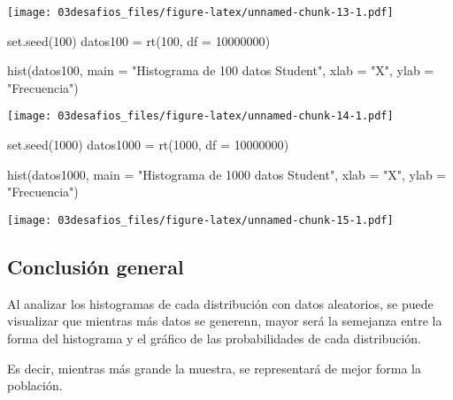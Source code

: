 \documentclass[
]{article}
\newenvironment{Shaded}{\begin{snugshade}}{\end{snugshade}}
\newcommand{\AttributeTok}[1]{\textcolor[rgb]{0.77,0.63,0.00}{#1}}
\newcommand{\DecValTok}[1]{\textcolor[rgb]{0.00,0.00,0.81}{#1}}
\newcommand{\FunctionTok}[1]{\textcolor[rgb]{0.00,0.00,0.00}{#1}}
\newcommand{\NormalTok}[1]{#1}
\newcommand{\OtherTok}[1]{\textcolor[rgb]{0.56,0.35,0.01}{#1}}
\newcommand{\StringTok}[1]{\textcolor[rgb]{0.31,0.60,0.02}{#1}}
\begin{document}
\texttt{[image: 03desafios\_files/figure-latex/unnamed-chunk-13-1.pdf]}

\begin{Shaded}
\begin{Highlighting}[]
\FunctionTok{set.seed}\NormalTok{(}\DecValTok{100}\NormalTok{)}
\NormalTok{datos100 }\OtherTok{=} \FunctionTok{rt}\NormalTok{(}\DecValTok{100}\NormalTok{, }\AttributeTok{df =} \DecValTok{10000000}\NormalTok{)}

\FunctionTok{hist}\NormalTok{(datos100, }\AttributeTok{main =} \StringTok{"Histograma de 100 datos Student"}\NormalTok{, }\AttributeTok{xlab =} \StringTok{"X"}\NormalTok{, }\AttributeTok{ylab =} \StringTok{"Frecuencia"}\NormalTok{)}
\end{Highlighting}
\end{Shaded}

\texttt{[image: 03desafios\_files/figure-latex/unnamed-chunk-14-1.pdf]}

\begin{Shaded}
\begin{Highlighting}[]
\FunctionTok{set.seed}\NormalTok{(}\DecValTok{1000}\NormalTok{)}
\NormalTok{datos1000 }\OtherTok{=} \FunctionTok{rt}\NormalTok{(}\DecValTok{1000}\NormalTok{, }\AttributeTok{df =} \DecValTok{10000000}\NormalTok{)}

\FunctionTok{hist}\NormalTok{(datos1000, }\AttributeTok{main =} \StringTok{"Histograma de 1000 datos Student"}\NormalTok{, }\AttributeTok{xlab =} \StringTok{"X"}\NormalTok{, }\AttributeTok{ylab =} \StringTok{"Frecuencia"}\NormalTok{)}
\end{Highlighting}
\end{Shaded}

\texttt{[image: 03desafios\_files/figure-latex/unnamed-chunk-15-1.pdf]}

\hypertarget{conclusiuxf3n-general}{%
\subsection{Conclusión general}\label{conclusiuxf3n-general}}

Al analizar los histogramas de cada distribución con datos aleatorios,
se puede visualizar que mientras más datos se generenn, mayor será la
semejanza entre la forma del histograma y el gráfico de las
probabilidades de cada distribución.

Es decir, mientras más grande la muestra, se representará de mejor forma
la población.
\end{document}
